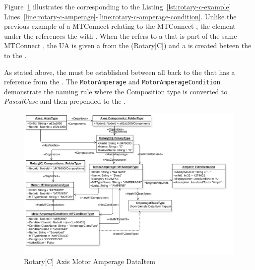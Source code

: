 \FloatBarrier

Figure~\ref{fig:rotary-c-amperage} illustrates the   corresponding to the Listing~\ref{lst:rotary-c-example} Lines~\ref{line:rotary-c-amperage}-\ref{line:rotary-c-amperage-condition}. Unlike the previous example of a MTConnect  relating to the MTConnect , the  element under the  references the  with  . When the  refers to a  that is part of the same MTConnect , the UA  is given a   from the  (Rotary[C]) and a   is created beteen the  to the .

As stated above, the   must be established between all  back to the  that has a reference from the . The \texttt{MotorAmperage} and \texttt{MotorAmperageCondition} demonstrate the naming rule where the Composition type is converted to \textit{PascalCase} and then prepended to the  . 

\begin{figure}[ht]
  \centering
  \includegraphics[width=1.0\textwidth]{diagrams/mtconnect-mapping/rotary-c-amperage.png}
  \caption{Rotary[C] Axis Motor Amperage DataItem}
  \label{fig:rotary-c-amperage}
\end{figure}

\FloatBarrier

